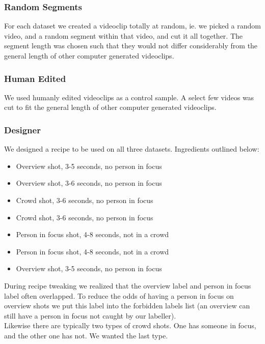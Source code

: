 \subsubsection{Random Segments}
% 
For each dataset we created a videoclip totally at random, ie. we picked a random video, and a random segment within that video, and cut it all together. The segment length was chosen such that they would not differ considerably from the general length of other computer generated videoclips.
%
\subsubsection{Human Edited}
% 
We used humanly edited videoclips as a control sample. A select few videos was cut to fit the general length of other computer generated videoclips.
%
\subsubsection{Designer}
We designed a recipe to be used on all three datasets. Ingredients outlined below:
\begin{itemize}
\item Overview shot, 3-5 seconds, no person in focus
\item Overview shot, 3-6 seconds, no person in focus
\item Crowd shot, 3-6 seconds, no person in focus
\item Crowd shot, 3-6 seconds, no person in focus
\item Person in focus shot, 4-8 seconds, not in a crowd
\item Person in focus shot, 4-8 seconds, not in a crowd
\item Overview shot, 3-5 seconds, no person in focus
\end{itemize}
%
During recipe tweaking we realized that the overview label and person in focus label often overlapped. To reduce the odds of having a person in focus on overview shots we put this label into the forbidden labels list (an overview can still have a person in focus not caught by our labeller).\\
Likewise there are typically two types of crowd shots. One has someone in focus, and the other one has not. We wanted the last type.
